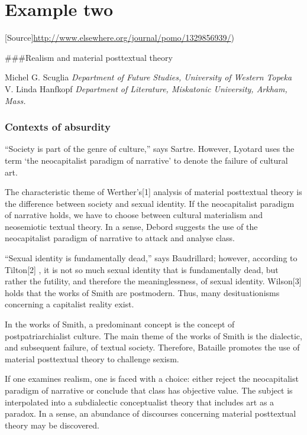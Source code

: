 \documentclass[]{book}
\begin{document}
\hypertarget{example-two}{%
\section{Example two}\label{example-two}}

{[}Source{]}\url{http://www.elsewhere.org/journal/pomo/1329856939/})

\#\#\#Realism and material posttextual theory

Michel G. Scuglia \emph{Department of Future Studies, University of
Western Topeka} V. Linda Hanfkopf \emph{Department of Literature,
Miskatonic University, Arkham, Mass.}

\hypertarget{contexts-of-absurdity}{%
\subsubsection{Contexts of absurdity}\label{contexts-of-absurdity}}

``Society is part of the genre of culture,'' says Sartre. However,
Lyotard uses the term `the neocapitalist paradigm of narrative' to
denote the failure of cultural art.

The characteristic theme of Werther's{[}1{]} analysis of material
posttextual theory is the difference between society and sexual
identity. If the neocapitalist paradigm of narrative holds, we have to
choose between cultural materialism and neosemiotic textual theory. In a
sense, Debord suggests the use of the neocapitalist paradigm of
narrative to attack and analyse class.

``Sexual identity is fundamentally dead,'' says Baudrillard; however,
according to Tilton{[}2{]} , it is not so much sexual identity that is
fundamentally dead, but rather the futility, and therefore the
meaninglessness, of sexual identity. Wilson{[}3{]} holds that the works
of Smith are postmodern. Thus, many desituationisms concerning a
capitalist reality exist.

In the works of Smith, a predominant concept is the concept of
postpatriarchialist culture. The main theme of the works of Smith is the
dialectic, and subsequent failure, of textual society. Therefore,
Bataille promotes the use of material posttextual theory to challenge
sexism.

If one examines realism, one is faced with a choice: either reject the
neocapitalist paradigm of narrative or conclude that class has objective
value. The subject is interpolated into a subdialectic conceptualist
theory that includes art as a paradox. In a sense, an abundance of
discourses concerning material posttextual theory may be discovered.
\end{document}
